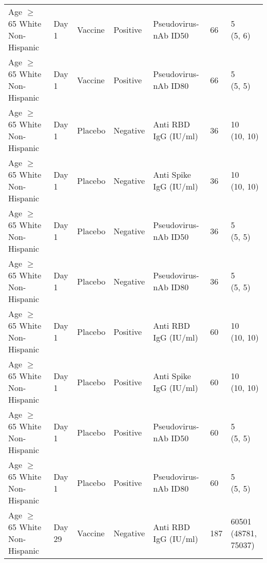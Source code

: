 \documentclass[]{book}
\theoremstyle{definition}
\theoremstyle{definition}
\theoremstyle{definition}
\newcommand{\1}{\mathbbm{1}}
\begin{document}
\begin{landscape}
\begin{ThreePartTable}
\begin{longtable}[t]{>{\raggedright\arraybackslash}p{7cm}llllll}
\hspace{1em}Age $\geq$ 65 White Non-Hispanic & Day 1 & Vaccine & Positive & Pseudovirus-nAb ID50 & 66 & \makecell[l]{5\\(5, 6)}\\
\hspace{1em}Age $\geq$ 65 White Non-Hispanic & Day 1 & Vaccine & Positive & Pseudovirus-nAb ID80 & 66 & \makecell[l]{5\\(5, 5)}\\
\hspace{1em}Age $\geq$ 65 White Non-Hispanic & Day 1 & Placebo & Negative & Anti RBD IgG (IU/ml) & 36 & \makecell[l]{10\\(10, 10)}\\
\hspace{1em}Age $\geq$ 65 White Non-Hispanic & Day 1 & Placebo & Negative & Anti Spike IgG (IU/ml) & 36 & \makecell[l]{10\\(10, 10)}\\
\hspace{1em}Age $\geq$ 65 White Non-Hispanic & Day 1 & Placebo & Negative & Pseudovirus-nAb ID50 & 36 & \makecell[l]{5\\(5, 5)}\\
\hspace{1em}Age $\geq$ 65 White Non-Hispanic & Day 1 & Placebo & Negative & Pseudovirus-nAb ID80 & 36 & \makecell[l]{5\\(5, 5)}\\
\hspace{1em}Age $\geq$ 65 White Non-Hispanic & Day 1 & Placebo & Positive & Anti RBD IgG (IU/ml) & 60 & \makecell[l]{10\\(10, 10)}\\
\hspace{1em}Age $\geq$ 65 White Non-Hispanic & Day 1 & Placebo & Positive & Anti Spike IgG (IU/ml) & 60 & \makecell[l]{10\\(10, 10)}\\
\hspace{1em}Age $\geq$ 65 White Non-Hispanic & Day 1 & Placebo & Positive & Pseudovirus-nAb ID50 & 60 & \makecell[l]{5\\(5, 5)}\\
\hspace{1em}Age $\geq$ 65 White Non-Hispanic & Day 1 & Placebo & Positive & Pseudovirus-nAb ID80 & 60 & \makecell[l]{5\\(5, 5)}\\
\hspace{1em}Age $\geq$ 65 White Non-Hispanic & Day 29 & Vaccine & Negative & Anti RBD IgG (IU/ml) & 187 & \makecell[l]{60501\\(48781, 75037)}\\

\end{longtable}
\end{ThreePartTable}
\end{landscape}
\end{document}
